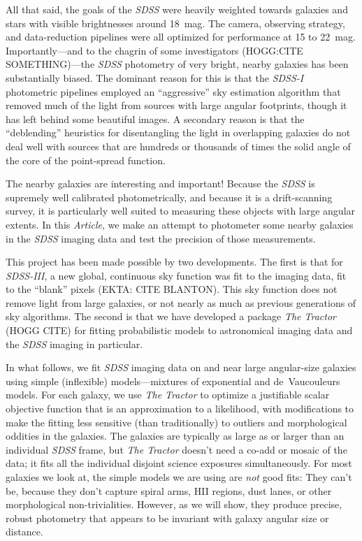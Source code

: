 \documentclass[12pt,preprint,pdftex]{aastex}
\newcommand{\project}[1]{\textsl{#1}}
\newcommand{\documentname}{\textsl{Article}}
\begin{document}
All that said, the goals of the \project{SDSS} were heavily weighted
towards galaxies and stars with visible brightnesses around 18~mag.
The camera, observing strategy, and data-reduction pipelines were all
optimized for performance at 15 to 22~mag.  Importantly---and to the
chagrin of some investigators (HOGG:CITE SOMETHING)---the \project{SDSS}
photometry of very bright, nearby galaxies has been substantially
biased.  The dominant reason for this is that the \project{SDSS-I}
photometric pipelines employed an ``aggressive'' sky estimation
algorithm that removed much of the light from sources with large
angular footprints, though it has left behind some beautiful images.
A secondary reason is that the ``deblending'' heuristics for
disentangling the light in overlapping galaxies do not deal well with
sources that are hundreds or thousands of times the solid angle of the
core of the point-spread function.

The nearby galaxies are interesting and important!  Because the
\project{SDSS} is supremely well calibrated photometrically, and
because it is a drift-scanning survey, it is particularly well suited
to measuring these objects with large angular extents.  In this
\documentname, we make an attempt to photometer some nearby galaxies
in the \project{SDSS} imaging data and test the precision of those
measurements.

This project has been made possible by two developments.  The first is
that for \project{SDSS-III}, a new global, continuous sky function was
fit to the imaging data, fit to the ``blank'' pixels (EKTA: CITE BLANTON).  This sky
function does not remove light from large galaxies, or not nearly as
much as previous generations of sky algorithms.  The second is that we
have developed a package \project{The Tractor} (HOGG CITE) for fitting
probabilistic models to astronomical imaging data and the
\project{SDSS} imaging in particular.

In what follows, we fit \project{SDSS} imaging
data on and near large angular-size galaxies using simple (inflexible)
models---mixtures of exponential and de~Vaucouleurs models.  For each
galaxy, we use \project{The Tractor} to
optimize a justifiable scalar objective function that is an
approximation to a likelihood, with modifications to make the fitting
less sensitive (than traditionally) to outliers and morphological
oddities in the galaxies.  The galaxies are typically as large as or
larger than an individual \project{SDSS} frame, but \project{The
  Tractor} doesn't need a co-add or mosaic of the data; it fits all
the individual disjoint science exposures simultaneously.  For most
galaxies we look at, the simple models we are using are \emph{not}
good fits: They can't be, because they don't capture spiral arms, HII
regions, dust lanes, or other morphological non-trivialities.
However, as we will show, they produce precise, robust photometry that
appears to be invariant with galaxy angular size or distance.
\end{document}
